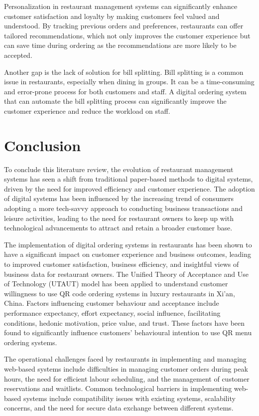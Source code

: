 Personalization in restaurant management systems can significantly enhance customer satisfaction and loyalty by making customers feel valued and understood. By tracking previous orders and preferences, restaurants can offer tailored recommendations, which not only improves the customer experience but can save time during ordering as the recommendations are more likely to be accepted.

Another gap is the lack of solution for bill splitting. Bill splitting is a common issue in restaurants, especially when dining in groups. It can be a time-consuming and error-prone process for both customers and staff. A digital ordering system that can automate the bill splitting process can significantly improve the customer experience and reduce the workload on staff.

\section{Conclusion}
To conclude this literature review, the evolution of restaurant management systems has seen a shift from traditional paper-based methods to digital systems, driven by the need for improved efficiency and customer experience. The adoption of digital systems has been influenced by the increasing trend of consumers adopting a more tech-savvy approach to conducting business transactions and leisure activities, leading to the need for restaurant owners to keep up with technological advancements to attract and retain a broader customer base. 

The implementation of digital ordering systems in restaurants has been shown to have a significant impact on customer experience and business outcomes, leading to improved customer satisfaction, business efficiency, and insightful views of business data for restaurant owners. The Unified Theory of Acceptance and Use of Technology (UTAUT) model has been applied to understand customer willingness to use QR code ordering systems in luxury restaurants in Xi'an, China. Factors influencing customer behaviour and acceptance include performance expectancy, effort expectancy, social influence, facilitating conditions, hedonic motivation, price value, and trust. These factors have been found to significantly influence customers' behavioural intention to use QR menu ordering systems.

The operational challenges faced by restaurants in implementing and managing web-based systems include difficulties in managing customer orders during peak hours, the need for efficient labour scheduling, and the management of customer reservations and waitlists. Common technological barriers in implementing web-based systems include compatibility issues with existing systems, scalability concerns, and the need for secure data exchange between different systems.

